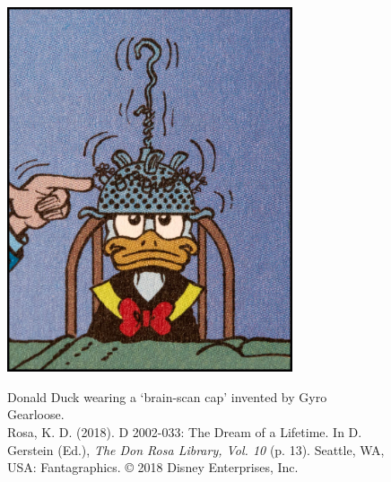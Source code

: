 
\cleardoublepage
\thispagestyle{empty}

\begin{figure}[p]
    \renewcommand\thefigure{1}
    \centering
    \captionsetup{justification=centering}
    \includegraphics[width=0.75\textwidth]{figures/donald.jpg}
    \caption[Donald Duck wearing a `brain-scan cap' invented by Gyro Gearloose.]{Donald Duck wearing a `brain-scan cap' invented by Gyro Gearloose. \vspace{\baselineskip} \\ Rosa, K. D. (2018). D 2002-033: The Dream of a Lifetime. In D. Gerstein (Ed.), \textit{The Don Rosa Library, Vol. 10} (p. 13). Seattle, WA, USA: Fantagraphics. © 2018 Disney Enterprises, Inc.}\nocite{rosa2018dream}
    \label{fig:donald}
\end{figure}
